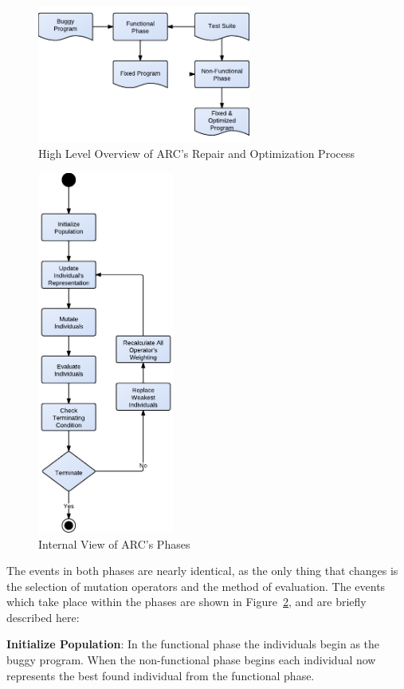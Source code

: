 \documentclass[10pt, conference, compsocconf]{IEEEtran}
\begin{document}
\begin{figure}[!h]
  \centering
  \includegraphics[width=7.0cm]{figures/process.pdf}
  \caption{High Level Overview of ARC's Repair and Optimization Process}
  \label{fig:process}
\end{figure}


\begin{figure}[!h]
  \centering
  \includegraphics[width=4.50cm]{figures/phases.pdf}
  \caption{Internal View of ARC's Phases}
  \label{fig:phases_internals}
\end{figure}

The events in both phases are nearly identical, as the only thing that changes
is the selection of mutation operators and the method of evaluation. The events
which take place within the phases are shown in
Figure~\ref{fig:phases_internals}, and are briefly described here:

\textbf{Initialize Population}: In the functional phase the individuals begin
as the buggy program. When the non-functional phase begins each individual now
represents the best found individual from the functional phase.
\end{document}
